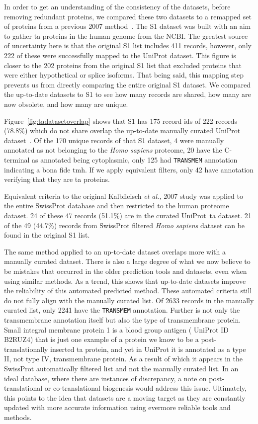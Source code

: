 In order to get an understanding of the consistency of the datasets, before removing redundant proteins, we compared these two datasets to a remapped set of proteins from a previous 2007 method~\cite{Kalbfleisch2007}.
The S1 dataset was built with an aim to gather \gls{ta} proteins in the human genome from the NCBI.
The greatest source of uncertainty here is that the original S1 list includes 411 records, however, only 222 of these were successfully mapped to the UniProt dataset.
This figure is closer to the 202 proteins from the original S1 list that excluded proteins that were either hypothetical or splice isoforms.
That being said, this mapping step prevents us from directly comparing the entire original S1 dataset.
We compared the up-to-date datasets to S1 to see how many records are shared, how many are now obsolete, and how many are unique.

Figure~\ref{fig:tadatasetoverlap} shows that S1 has 175 record ids of 222 records (78.8\%) which do not share overlap the up-to-date manually curated UniProt dataset~\cite{TheUniProtConsortium2014}.
Of the 170 unique records of that S1 dataset, 4 were manually annotated as not belonging to the \textit{Homo sapiens} proteome, 20 have the C\--terminal as annotated being cytoplasmic, only 125 had \texttt{TRANSMEM} annotation indicating a bona fide \gls{tmh}.
If we apply equivalent filters, only 42 have annotation verifying that they are \gls{ta} proteins.

Equivalent criteria to the original Kalbfleisch \textit{et al.,} 2007 \cite{Kalbfleisch2007} study was applied to the entire SwissProt database and then restricted to the human proteome dataset.
24 of these 47 records (51.1\%) are in the curated UniProt~\gls{ta}  dataset.
21 of the 49 (44.7\%) records from SwissProt filtered \textit{Homo sapiens} dataset can be found in the original S1 list.

The same method applied to an up-to-date dataset overlaps more with a manually curated dataset.
There is also a large degree of what we now believe to be mistakes that occurred in the older prediction tools and datasets, even when using similar methods.
As a trend, this shows that up-to-date datasets improve the reliability of this automated predicted method.
These automated criteria still do not fully align with the manually curated list.
Of 2633 records in the manually curated list, only 2241 have the \texttt{TRANSMEM} annotation.
Further is not only the transmembrane annotation itself but also the type of transmembrane protein.
Small integral membrane protein 1 is a blood group antigen ( UniProt ID B2RUZ4) that is just one example of a protein we know to be a post\--translationally inserted \gls{ta} protein, and yet in  UniProt it is annotated as a type II, not type IV, transmembrane protein.
As a result of which it appears in the SwissProt automatically filtered list and not the manually curated list.
In an ideal database, where there are instances of discrepancy, a note on post\--translational or co-translational biogenesis would address this issue.
Ultimately, this points to the idea that datasets are a moving target as they are constantly updated with more accurate information using evermore reliable tools and methods.



